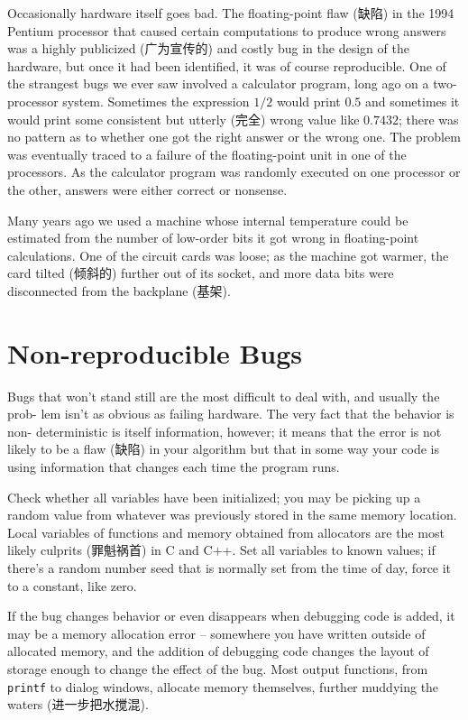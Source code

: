 Occasionally hardware itself goes bad. The floating-point flaw (缺陷) in
the 1994 Pentium processor that caused certain computations to produce
wrong answers was a highly publicized (广为宣传的) and costly bug in the
design of the hardware, but once it had been identified, it was of course
reproducible.  One of the strangest bugs we ever saw involved a calculator
program, long ago on a two-processor system.  Sometimes the expression
$1/2$ would print $0.5$ and sometimes it would print some consistent but
utterly (完全) wrong value like $0.7432$; there was no pattern as to
whether one got the right answer or the wrong one. The problem was
eventually traced to a failure of the floating-point unit in one of the
processors. As the calculator program was randomly executed on one
processor or the other, answers were either correct or nonsense.

Many years ago we used a machine whose internal temperature could be
estimated from the number of low-order bits it got wrong in floating-point
calculations. One of the circuit cards was loose; as the machine got
warmer, the card tilted (倾斜的) further out of its socket, and more data
bits were disconnected from the backplane (基架).

\section{Non-reproducible Bugs}

Bugs that won't stand still are the most difficult to deal with, and
usually the prob- lem isn't as obvious as failing hardware. The very fact
that the behavior is non- deterministic is itself information, however; it
means that the error is not likely to be a flaw (缺陷) in your algorithm
but that in some way your code is using information that changes each time
the program runs.

Check whether all variables have been initialized; you may be picking up a
random value from whatever was previously stored in the same memory
location.  Local variables of functions and memory obtained from allocators
are the most likely culprits (罪魁祸首) in C and C++. Set all variables to
known values; if there's a random number seed that is normally set from the
time of day, force it to a constant, like zero.

If the bug changes behavior or even disappears when debugging code is
added, it may be a memory allocation error -- somewhere you have written
outside of allocated memory, and the addition of debugging code changes the
layout of storage enough to change the effect of the bug. Most output
functions, from \verb'printf' to dialog windows, allocate memory
themselves, further muddying the waters (进一步把水搅混).

